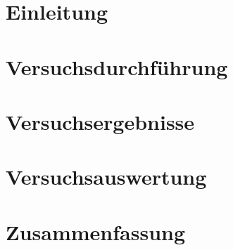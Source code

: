 % 
 


%


\pagestyle{empty}

%
\tableofcontents
%
\newpage
\pagestyle{headings}
%
\section{Einleitung}
\label{sec:Einleitung}

\clearpage
%
\section{Versuchsdurchführung}
\label{sec:Durchführung}

\clearpage
%
\section{Versuchsergebnisse}
\label{sec:Ergebnisse}

\clearpage
%
\section{Versuchsauswertung}
\label{sec:Auswertung}

\clearpage
%
\section{Zusammenfassung}
\label{sec:Zusammenfassung}

\clearpage
%

\listoftables
\newpage
%
\listoffigures
\newpage
%
%

\newpage
%
%
%

%
